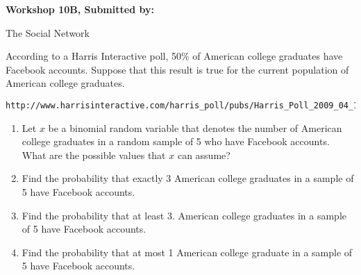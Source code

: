 \documentclass[11pt]{book}\usepackage[]{graphicx}\usepackage[]{color}
\begin{document}
\begin{exercises}
\begin{exercise}
\end{exercise}
\begin{solution}

\end{solution}


\clearpage

     \begin{exercise}  %

    \begin{center}
\begin{flushleft}\textbf{\large \hfill Workshop 10B, Submitted by: }\end{flushleft}

\end{center}

The Social Network

According to a Harris Interactive poll, 50\% of American college graduates have Facebook accounts. Suppose that this result is true for the current population of American college graduates.

\begin{verbatim}
http://www.harrisinteractive.com/harris_poll/pubs/Harris_Poll_2009_04_16.pdf
\end{verbatim}

\begin{enumerate}
  \item Let $x$ be a binomial random variable that denotes the number of American college graduates in a random sample of 5 who have Facebook accounts. What are the possible values that $x$ can assume?
  \item Find the probability that exactly 3 American college graduates in a sample of 5 have Facebook accounts.
  \item Find the probability that at least 3. American college graduates in a sample of 5 have Facebook accounts.
  \item Find the probability that at most 1 American college graduate in a sample of 5 have Facebook accounts.
\end{enumerate}


\end{exercise}
\end{exercises}
\end{document}
